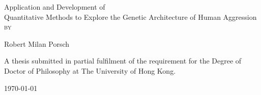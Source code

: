 \documentclass[header.tex]{subfiles}
\newlength{\drop}
\begin{document}
\begin{titlepage}
  \textheight
  \centering
  \vspace*{\baselineskip}
  {\LARGE Application and Development of \\ Quantitative Methods to Explore the Genetic Architecture of Human Aggression}\\[0.2\baselineskip]
  \scshape
  \vspace*{2\baselineskip}
  by \\[\baselineskip]
  {\Large Robert Milan Porsch\par}
  \vfill
  A thesis submitted in partial fulfilment of the requirement for the Degree of Doctor of Philosophy at The University of Hong Kong.\par
  {\today\par}
\end{titlepage}
\end{document}
